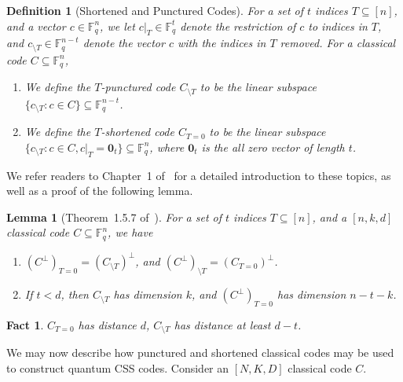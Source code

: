 \documentclass[11pt]{article}
\newtheorem{lemma}[theorem]{Lemma}
\newtheorem{definition}[theorem]{Definition}
\newtheorem{fact}[theorem]{Fact}
\theoremstyle{definition}
\newcommand{\sm}{\setminus}
\newcommand{\FF}{\mathbb{F}}
\newcommand{\K}{K}
\newcommand{\N}{N}
\newcommand{\punc}[2]{#1_{\sm #2}}
\newcommand{\puncT}[1]{\punc{#1}{T}}
\newcommand{\shrT}[1]{#1_{T = 0}}
\begin{document}
\begin{definition}[Shortened and Punctured Codes]
    For a set of $t$ indices $T\subseteq [n]$, and a vector $c\in \FF_q^n$,
    we let $c|_T \in \FF_q^{t}$ denote the restriction of $c$ to indices in $T$, and $\puncT{c} \in \FF_q^{n-t}$ denote the vector $c$ with the indices in $T$ removed. 
    For a classical code $C\subseteq \FF_q^n$, 
    \begin{enumerate}[itemsep = 0pt]
        \item We define the $T$-punctured code $\puncT{C}$ to be the linear subspace $\{\puncT{c}: c\in C\}\subseteq \FF_q^{n-t}$.
        \item We define the $T$-shortened code $\shrT{C}$ to be the linear subspace $\{\puncT{c}: c\in C, c|_T = \mathbf{0}_t\}\subseteq \FF_q^{n}$, where $\mathbf{0}_t$ is the all zero vector of length $t$.
    \end{enumerate}  
\end{definition}
We refer readers to Chapter~1 of~\cite{Fundamentals_of_ECC} for a detailed introduction to these topics, as well as a proof of the following lemma.
\begin{lemma}[Theorem~1.5.7 of~\cite{Fundamentals_of_ECC}]
\label{lem:short_punc}
    For a set of $t$ indices $T\subseteq [n]$, and a $[n, k, d]$ classical code $C\subseteq \FF_q^n$, we have
    \begin{enumerate}[itemsep = 0pt]
        \item $\shrT{(C^{\perp})} = (\puncT{C})^\perp$, and $\puncT{(C^\perp)} = (\shrT{C})^\perp$. 
        \item If $t < d$, then $\puncT{C}$ has dimension $k$, and $\shrT{(C^\perp)}$ has dimension $n-t-k$. 
    \end{enumerate}  
\end{lemma}

\begin{fact}\label{fact:punctured_distance}
    $\shrT{C}$ has distance $d$, $\puncT{C}$ has distance at least $d-t$. 
\end{fact}

We may now describe how punctured and shortened classical codes may be used to construct quantum CSS codes. Consider an $[\N, \K, D]$ classical code $C$.
\end{document}

